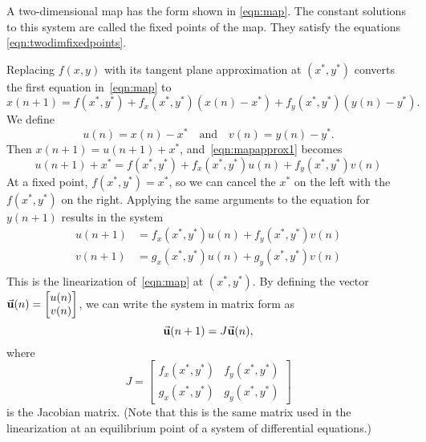 A two-dimensional map has the form
shown in \eqref{eqn:map}.
The constant solutions to this system are called the fixed points
of the map.
They satisfy the equations \eqref{eqn:twodimfixedpoints}.

Replacing $f(x,y)$ with its tangent plane
approximation at $(x^*,y^*)$ converts the first equation in~\eqref{eqn:map}
to
\begin{equation}
  x(n+1) = f(x^*,y^*) + f_x(x^*,y^*)(x(n)-x^*) + f_y(x^*,y^*)(y(n)-y^*).
\label{eqn:mapapprox1}
\end{equation}
We define
\begin{equation}
    u(n) = x(n) - x^* \quad\textrm{and}\quad
    v(n) = y(n) - y^*.
\end{equation}
  Then $x(n+1) = u(n+1) + x^*$, and~\eqref{eqn:mapapprox1}
becomes
\begin{equation}
   u(n+1) + x^* = f(x^*,y^*) + f_x(x^*,y^*)u(n) + f_y(x^*,y^*)v(n)
\end{equation}
At a fixed point, $f(x^*,y^*) = x^*$, so we can cancel the $x^*$ on the
left with the $f(x^*,y^*)$ on the right.  Applying the same arguments
to the equation for $y(n+1)$ results in the system
\begin{equation}
\begin{split}
   u(n+1) & = f_x(x^*,y^*)u(n) + f_y(x^*,y^*)v(n) \\
   v(n+1) & = g_x(x^*,y^*)u(n) + g_y(x^*,y^*)v(n) \\
\end{split}
\end{equation}
This is the linearization
of~\eqref{eqn:map} at $(x^*,y^*)$.
By defining the vector $\vec{\textbf{u}}(n) = \begin{bmatrix} u(n) \\ v(n) \end{bmatrix}$,
we can write the system in matrix form as
\begin{equation}
  \vec{\textbf{u}}(n+1) = J\vec{\textbf{u}}(n),
\label{eqn:linearizedmap}
\end{equation}
where
\begin{equation}
   J = \begin{bmatrix}
             f_x(x^*,y^*) & f_y(x^*,y^*) \\
	     g_x(x^*,y^*) & g_y(x^*,y^*)
       \end{bmatrix}
\label{eqn:mapjac}
\end{equation}
is the Jacobian matrix.
(Note that this is the same matrix used in the linearization
at an equilibrium point of a system of differential equations.)

